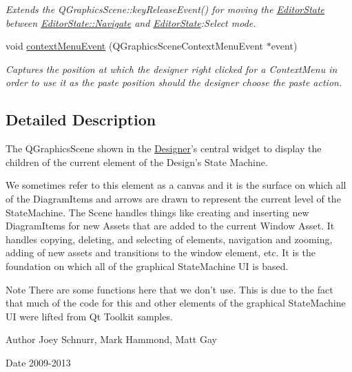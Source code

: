 \begin{DoxyCompactItemize}
\begin{DoxyCompactList}\small\item\em Extends the Q\-Graphics\-Scene\-::key\-Release\-Event() for moving the \hyperlink{class_editor_state}{Editor\-State} between \hyperlink{class_editor_state_a30123e595784b2228edc2a0c2b46ab28a3ba8f119a9df84447a32145998ec62dd}{Editor\-State\-::\-Navigate} and \hyperlink{class_editor_state}{Editor\-State}\-:Select mode. \end{DoxyCompactList}\item 
void \hyperlink{class_diagram_scene_adfe114873fac1d13077a1c72deb58a1c}{context\-Menu\-Event} (Q\-Graphics\-Scene\-Context\-Menu\-Event $\ast$event)
\begin{DoxyCompactList}\small\item\em Captures the position at which the designer right clicked for a Context\-Menu in order to use it as the paste position should the designer choose the paste action. \end{DoxyCompactList}\end{DoxyCompactItemize}


\subsection{Detailed Description}
The Q\-Graphics\-Scene shown in the \hyperlink{class_designer}{Designer}'s central widget to display the children of the current element of the Design's State Machine. 

We sometimes refer to this element as a canvas and it is the surface on which all of the Diagram\-Items and arrows are drawn to represent the current level of the State\-Machine. The Scene handles things like creating and inserting new Diagram\-Items for new Assets that are added to the current Window Asset. It handles copying, deleting, and selecting of elements, navigation and zooming, adding of new assets and transitions to the window element, etc. It is the foundation on which all of the graphical State\-Machine U\-I is based. \begin{DoxyNote}{Note}
There are some functions here that we don't use. This is due to the fact that much of the code for this and other elements of the graphical State\-Machine U\-I were lifted from Qt Toolkit samples. 
\end{DoxyNote}
\begin{DoxyAuthor}{Author}
Joey Schnurr, Mark Hammond, Matt Gay 
\end{DoxyAuthor}
\begin{DoxyDate}{Date}
2009-\/2013 
\end{DoxyDate}


